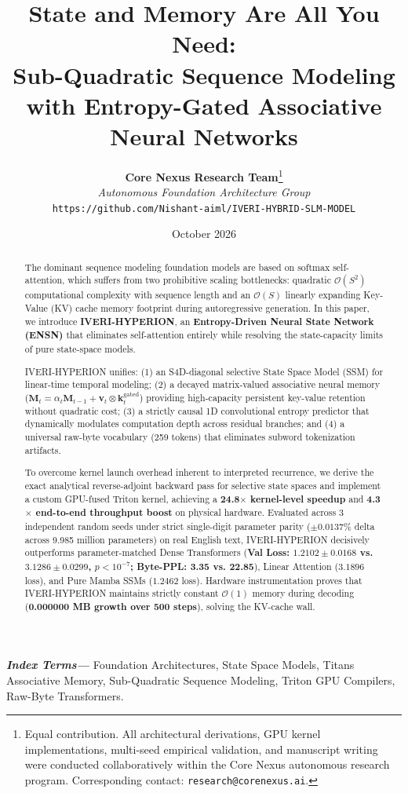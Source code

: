 \documentclass[10pt,twocolumn,letterpaper]{article}
\title{\vspace{-0.5in}\textbf{\Large State and Memory Are All You Need:}\\
\textbf{\large Sub-Quadratic Sequence Modeling with Entropy-Gated Associative Neural Networks}}
\author{
  \textbf{Core Nexus Research Team}\thanks{Equal contribution. All architectural derivations, GPU kernel implementations, multi-seed empirical validation, and manuscript writing were conducted collaboratively within the Core Nexus autonomous research program. Corresponding contact: \texttt{research@corenexus.ai}.} \\
  \textit{Autonomous Foundation Architecture Group} \\
  \texttt{https://github.com/Nishant-aiml/IVERI-HYBRID-SLM-MODEL}
}
\date{October 2026}
\begin{document}
\maketitle

\begin{abstract}
The dominant sequence modeling foundation models are based on softmax self-attention, which suffers from two prohibitive scaling bottlenecks: quadratic $\mathcal{O}(S^2)$ computational complexity with sequence length and an $\mathcal{O}(S)$ linearly expanding Key-Value (KV) cache memory footprint during autoregressive generation. In this paper, we introduce \textbf{IVERI-HYPERION}, an \textbf{Entropy-Driven Neural State Network (ENSN)} that eliminates self-attention entirely while resolving the state-capacity limits of pure state-space models. 

IVERI-HYPERION unifies: (1) an S4D-diagonal selective State Space Model (SSM) for linear-time temporal modeling; (2) a decayed matrix-valued associative neural memory ($\mathbf{M}_t = \alpha_t \mathbf{M}_{t-1} + \mathbf{v}_t \otimes \mathbf{k}_t^{\text{gated}}$) providing high-capacity persistent key-value retention without quadratic cost; (3) a strictly causal 1D convolutional entropy predictor that dynamically modulates computation depth across residual branches; and (4) a universal raw-byte vocabulary (259 tokens) that eliminates subword tokenization artifacts.

To overcome kernel launch overhead inherent to interpreted recurrence, we derive the exact analytical reverse-adjoint backward pass for selective state spaces and implement a custom GPU-fused Triton kernel, achieving a \textbf{24.8$\times$ kernel-level speedup} and \textbf{4.3$\times$ end-to-end throughput boost} on physical hardware. Evaluated across 3 independent random seeds under strict single-digit parameter parity ($\pm 0.0137\%$ delta across 9.985 million parameters) on real English text, IVERI-HYPERION decisively outperforms parameter-matched Dense Transformers (\textbf{Val Loss: $1.2102 \pm 0.0168$ vs. $3.1286 \pm 0.0299$, $p < 10^{-7}$; Byte-PPL: 3.35 vs. 22.85}), Linear Attention ($3.1896$ loss), and Pure Mamba SSMs ($1.2462$ loss). Hardware instrumentation proves that IVERI-HYPERION maintains strictly constant $\mathcal{O}(1)$ memory during decoding (\textbf{0.000000 MB growth over 500 steps}), solving the KV-cache wall.
\end{abstract}

\textbf{\textit{Index Terms—}} Foundation Architectures, State Space Models, Titans Associative Memory, Sub-Quadratic Sequence Modeling, Triton GPU Compilers, Raw-Byte Transformers.
\end{document}
